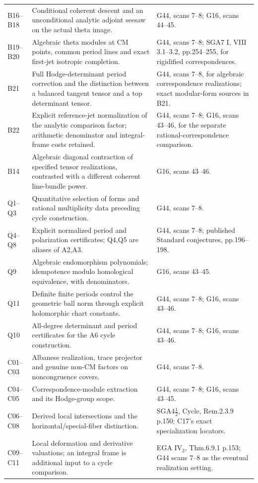 \documentclass[11pt]{article}
\theoremstyle{definition}\newtheorem{definition}[theorem]{Definition}\newtheorem{remark}[theorem]{Remark}
\begin{document}
\begin{longtable}{@{}p{.18\linewidth}p{.48\linewidth}p{.27\linewidth}@{}}
B16--B18 & Conditional coherent descent and an unconditional analytic adjoint seesaw on the actual theta image. & G44, scans 7--8; G16, scans 44--45.\\
B19--B20 & Algebraic theta modules at CM points, common period lines and exact first-jet isotropic completion. & G44, scans 7--8; SGA7 I, VIII 3.1--3.2, pp.254--255, for rigidified correspondences.\\
B21 & Full Hodge-determinant period correction and the distinction between a balanced tangent tensor and a top determinant tensor. & G44, scans 7--8, for algebraic correspondence realizations; exact modular-form sources in B21.\\
B22 & Explicit reference-jet normalization of the analytic comparison factor; arithmetic denominator and integral-frame costs retained. & G44, scans 7--8; G16, scans 43--46, for the separate rational-correspondence comparison.\\
B14 & Algebraic diagonal contraction of specified tensor realizations, contrasted with a different coherent line-bundle power. & G16, scans 43--46.\\
Q1--Q3 & Quantitative selection of forms and rational multiplicity data preceding cycle construction. & G44, scans 7--8.\\
Q4--Q8 & Explicit normalized period and polarization certificates; Q4,Q5 are aliases of A2,A3. & G44, scans 7--8; published Standard conjectures, pp.196--198.\\
Q9 & Algebraic endomorphism polynomials; idempotence modulo homological equivalence, with denominators. & G16, scans 43--45.\\
Q11 & Definite finite periods control the geometric ball norm through explicit holomorphic chart constants. & G44, scans 7--8; G16, scans 43--46.\\
Q10 & All-degree determinant and period certificates for the A6 cycle construction. & G44, scans 7--8; G16, scans 43--46.\\
C01--C03 & Albanese realization, trace projector and genuine non-CM factors on noncongruence covers. & G44, scans 7--8.\\
C04--C05 & Correspondence-module extraction and its Hodge-group scope. & G44, scans 7--8; G16, scans 43--45.\\
C06--C08 & Derived local intersections and the horizontal/special-fiber distinction. & SGA4$\frac12$, Cycle, Rem.2.3.9 p.150; C17's exact specialization locators.\\
C09--C11 & Local deformation and derivative valuations; an integral frame is additional input to a cycle comparison. & EGA IV$_2$, Thm.6.9.1 p.153; G44 scans 7--8 as the eventual realization setting.\\

\end{longtable}
\end{document}
